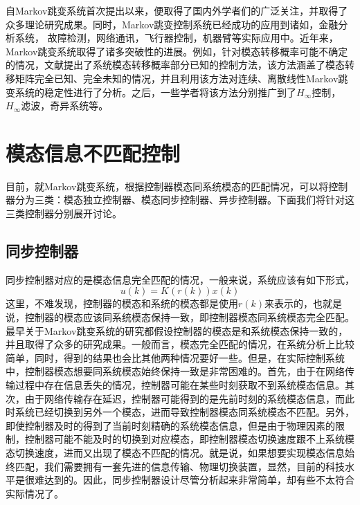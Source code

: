 	自Markov跳变系统首次提出以来\cite{florentin1961optimal}，便取得了国内外学者们的广泛关注，并取得了众多理论研究成果\cite{costa2006discrete,de2000output,xiong2005robust,ma2010stability,zhang2009hestimation,xu2007delay}。同时，Markov跳变控制系统已经成功的应用到诸如，金融分析系统\cite{mamon2007hidden}， 故障检测\cite{zhong2005faultdetection}，网络通讯\cite{network-communication-kim2004}，飞行器控制\cite{bar1993estimation,gray2000stability}，机器臂\cite{goncalves2004nonlinear}等实际应用中。近年来，Markov跳变系统取得了诸多突破性的进展。例如，针对模态转移概率可能不确定的情况，文献\cite{zhang2009stability}提出了系统模态转移概率部分已知的控制方法，该方法涵盖了模态转移矩阵完全已知、完全未知的情况，并且利用该方法对连续、离散线性Markov跳变系统的稳定性进行了分析。之后，一些学者将该方法分别推广到了$H_{\infty}$控制\cite{luan2012h}，$H_\infty$滤波\cite{ma2009robust}，奇异系统\cite{kao2014stabilization}等。

\section{模态信息不匹配控制}
	目前，就Markov跳变系统，根据控制器模态同系统模态的匹配情况，可以将控制器分为三类：模态独立控制器、模态同步控制器、异步控制器。下面我们将针对这三类控制器分别展开讨论。
	\subsection{同步控制器}
	同步控制器对应的是模态信息完全匹配的情况，一般来说，系统应该有如下形式，
	\begin{equation}
		u(k)=K(r(k))x(k)
	\end{equation}
	这里，不难发现，控制器的模态和系统的模态都是使用$r(k)$来表示的，也就是说，控制器的模态应该同系统模态保持一致，即控制器模态同系统模态完全匹配。最早关于Markov跳变系统的研究都假设控制器的模态是和系统模态保持一致的，并且取得了众多的研究成果。一般而言，模态完全匹配的情况，在系统分析上比较简单，同时，得到的结果也会比其他两种情况要好一些。但是，在实际控制系统中，控制器模态想要同系统模态始终保持一致是非常困难的。首先，由于在网络传输过程中存在信息丢失的情况，控制器可能在某些时刻获取不到系统模态信息。其次，由于网络传输存在延迟，控制器可能得到的是先前时刻的系统模态信息，而此时系统已经切换到另外一个模态，进而导致控制器模态同系统模态不匹配。另外，即使控制器及时的得到了当前时刻精确的系统模态信息，但是由于物理因素的限制，控制器可能不能及时的切换到对应模态，即控制器模态切换速度跟不上系统模态切换速度，进而又出现了模态不匹配的情况。就是说，如果想要实现模态信息始终匹配，我们需要拥有一套先进的信息传输、物理切换装置，显然，目前的科技水平是很难达到的。因此，同步控制器设计尽管分析起来非常简单，却有些不太符合实际情况了。
	
